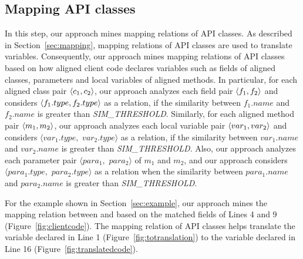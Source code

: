 \subsection{Mapping API classes}
\label{sec:approach:mappingtypes}

In this step, our approach mines mapping relations of
API classes. As described in Section~\ref{sec:mapping}, mapping relations of API classes are used
to translate variables. Consequently, our approach mines mapping
relations of API classes based on how aligned client code declares
variables such as fields of aligned classes, parameters 
and local variables of aligned methods. In
particular, for each aligned class pair $\langle c_1, c_2 \rangle$, our
approach analyzes each field pair $\langle f_1, f_2 \rangle$ and considers
$\langle f_1.type, f_2.type \rangle$ as a relation, if the similarity between $f_1.name$ and $f_2.name$ is
greater than \emph{SIM\_THRESHOLD}. Similarly, for each aligned method pair
$\langle m_1, m_2 \rangle$, our approach analyzes each local variable pair
$\langle var_1, var_2 \rangle$ and considers $\langle var_1.type,$ $
var_2.type\rangle$ as a relation, if the similarity between 
$var_1.name$ and $var_2.name$ is greater than
\emph{SIM\_THRESHOLD}. Also, our approach analyzes each parameter pair
$\langle para_1, $ $para_2\rangle$ of $m_1$ and $m_2$, and our
approach considers $\langle para_1.type,$ $para_2.type\rangle$ as
a relation when the similarity between $para_1.name$ and $para_2.name$ is greater than \emph{SIM\_THRESHOLD}.

For the example shown in Section~\ref{sec:example}, our approach
mines the mapping relation between  and
 based on the matched fields of Lines 4
and 9 (Figure~\ref{fig:clientcode}). The mapping relation of API classes helps translate the
variable declared in Line 1 (Figure~\ref{fig:totranslation})
to the variable declared in Line 16 (Figure~\ref{fig:translatedcode}).


